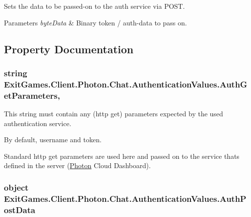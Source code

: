 Sets the data to be passed-\/on to the auth service via P\+O\+ST. 


\begin{DoxyParams}{Parameters}
{\em byte\+Data} & Binary token / auth-\/data to pass on.\\
\hline
\end{DoxyParams}


\subsection{Property Documentation}
\subsubsection[{\texorpdfstring{Auth\+Get\+Parameters}{AuthGetParameters}}]{\setlength{\rightskip}{0pt plus 5cm}string Exit\+Games.\+Client.\+Photon.\+Chat.\+Authentication\+Values.\+Auth\+Get\+Parameters\hspace{0.3cm}{\ttfamily [get]}, {\ttfamily [set]}}\hypertarget{class_exit_games_1_1_client_1_1_photon_1_1_chat_1_1_authentication_values_a62b771eb77744555663093db81de52ad}{}\label{class_exit_games_1_1_client_1_1_photon_1_1_chat_1_1_authentication_values_a62b771eb77744555663093db81de52ad}


This string must contain any (http get) parameters expected by the used authentication service. 

By default, username and token.

Standard http get parameters are used here and passed on to the service that\textquotesingle{}s defined in the server (\hyperlink{namespace_exit_games_1_1_client_1_1_photon}{Photon} Cloud Dashboard).
\subsubsection[{\texorpdfstring{Auth\+Post\+Data}{AuthPostData}}]{\setlength{\rightskip}{0pt plus 5cm}object Exit\+Games.\+Client.\+Photon.\+Chat.\+Authentication\+Values.\+Auth\+Post\+Data\hspace{0.3cm}{\ttfamily [get]}}\hypertarget{class_exit_games_1_1_client_1_1_photon_1_1_chat_1_1_authentication_values_a62980bf198ce9565c41d408a4df93310}{}\label{class_exit_games_1_1_client_1_1_photon_1_1_chat_1_1_authentication_values_a62980bf198ce9565c41d408a4df93310}


